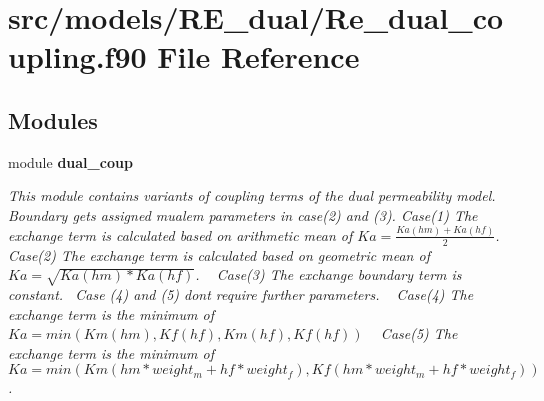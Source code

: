 \section{src/models/\+R\+E\+\_\+dual/\+Re\+\_\+dual\+\_\+coupling.f90 File Reference}
\label{_re__dual__coupling_8f90}
\subsection*{Modules}
\begin{DoxyCompactItemize}
\item 
module {\bf dual\+\_\+coup}
\begin{DoxyCompactList}\small\item\em This module contains variants of coupling terms of the dual permeability model. Boundary gets assigned mualem parameters in case(2) and (3). Case(1) The exchange term is calculated based on arithmetic mean of $Ka=\frac{Ka(hm)+Ka(hf)}{2}$. ~\newline
 Case(2) The exchange term is calculated based on geometric mean of $Ka=\sqrt{Ka(hm)*Ka(hf)}$. ~\newline
 Case(3) The exchange boundary term is constant.~\newline
 Case (4) and (5) don\textquotesingle{}t require further parameters. ~\newline
 Case(4) The exchange term is the minimum of $Ka=min(Km(hm),Kf(hf),Km(hf),Kf(hf))$ ~\newline
 Case(5) The exchange term is the minimum of $Ka=min(Km(hm*weight_m+hf*weight_f),Kf(hm*weight_m+hf*weight_f))$. \end{DoxyCompactList}\end{DoxyCompactItemize}
